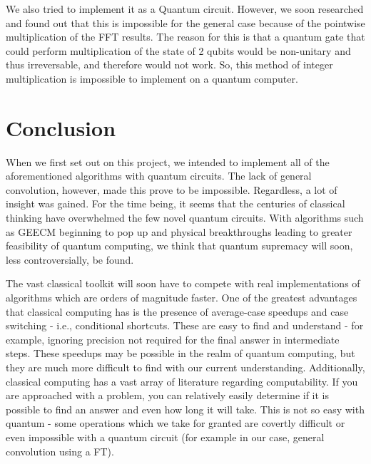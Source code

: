 \documentclass[a4paper,11pt]{article}
\theoremstyle{mytheor}
\begin{document}
We also tried to implement it as a Quantum circuit. However, we soon researched and found out that this is impossible for the general case \cite{qconv} because of the pointwise multiplication of the FFT results. The reason for this is that a quantum gate that could perform multiplication of the state of 2 qubits would be non-unitary and thus irreversable, and therefore would not work. So, this method of integer multiplication is impossible to implement on a quantum computer.


\section{Conclusion}
When we first set out on this project, we intended to implement all of the aforementioned algorithms with quantum circuits. The lack of general convolution, however, made this prove to be impossible. Regardless, a lot of insight was gained. For the time being, it seems that the centuries of classical thinking have overwhelmed the few novel quantum circuits. With algorithms such as GEECM beginning to pop up and physical breakthroughs leading to greater feasibility of quantum computing, we think that quantum supremacy will soon, less controversially, be found.

The vast classical toolkit will soon have to compete with real implementations of algorithms which are orders of magnitude faster. One of the greatest advantages that classical computing has is the presence of average-case speedups and case switching - i.e., conditional shortcuts. These are easy to find and understand - for example, ignoring precision not required for the final answer in intermediate steps. These speedups may be possible in the realm of quantum computing, but they are much more difficult to find with our current understanding. Additionally, classical computing has a vast array of literature regarding computability. If you are approached with a problem, you can relatively easily determine if it is possible to find an answer and even how long it will take. This is not so easy with quantum - some operations which we take for granted are covertly difficult or even impossible with a quantum circuit (for example in our case, general convolution using a FT).
\end{document}
